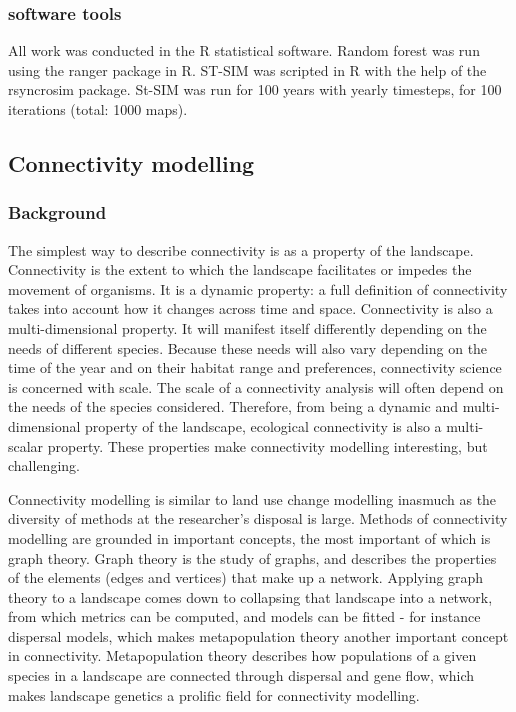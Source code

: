 \subsubsection{software tools}
All work was conducted in the R statistical software. Random forest was run using the ranger package in R. ST-SIM was scripted in R with the help of the rsyncrosim package. St-SIM was run for 100 years with yearly timesteps, for 100 iterations (total: 1000 maps).\\

\subsection{Connectivity modelling}

\subsubsection{Background}
The simplest way to describe connectivity is as a property of the landscape. Connectivity is the extent to which the landscape facilitates or impedes the movement of organisms. It is a dynamic property: a full definition of connectivity takes into account how it changes across time and space. Connectivity is also a multi-dimensional property. It will manifest itself differently depending on the needs of different species. Because these needs will also vary depending on the time of the year and on their habitat range and preferences, connectivity science is concerned with scale. The scale of a connectivity analysis will often depend on the needs of the species considered. Therefore, from being a dynamic and multi-dimensional property of the landscape, ecological connectivity is also a multi-scalar property. These properties make connectivity modelling interesting, but challenging.

Connectivity modelling is similar to land use change modelling inasmuch as the diversity of methods at the researcher’s disposal is large.  Methods of connectivity modelling are grounded in important concepts, the most important of which is graph theory. Graph theory is the study of graphs, and describes the properties of the elements (edges and vertices) that make up a network. Applying graph theory to a landscape comes down to collapsing that landscape into a network, from which metrics can be computed, and models can be fitted - for instance dispersal models, which makes metapopulation theory another important concept in connectivity. Metapopulation theory describes how populations of a given species in a landscape are connected through dispersal and gene flow, which makes landscape genetics a prolific field for connectivity modelling.

